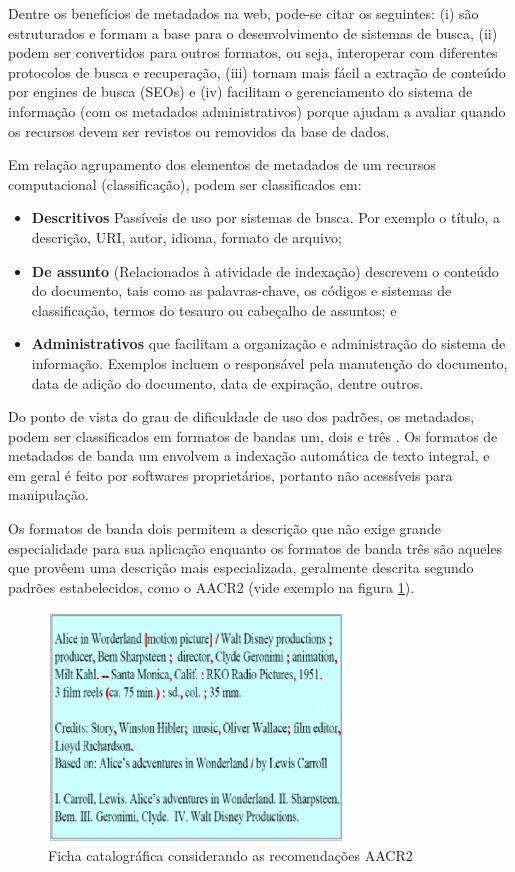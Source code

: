 Dentre os benefícios de metadados na web, pode-se citar os seguintes: (i) são estruturados e formam a base para o desenvolvimento de sistemas de busca, (ii) podem ser convertidos para outros formatos, ou seja, interoperar com diferentes protocolos de busca e recuperação, (iii) tornam mais fácil a extração de conteúdo por engines de busca (SEOs) e (iv) facilitam o gerenciamento do sistema de informação (com os metadados administrativos) porque ajudam a avaliar quando os recursos devem ser revistos ou removidos da base de dados.

Em relação agrupamento dos elementos de metadados de um recursos computacional (classificação), podem ser classificados em:

\begin{itemize}
	\item \textbf{Descritivos} Passíveis de uso por sistemas de busca. Por exemplo o título, a descrição, URI, autor, idioma, formato de arquivo;
	\item \textbf{De assunto} (Relacionados à atividade de indexação) descrevem o conteúdo do documento, tais como as palavras-chave, os códigos e sistemas de classificação, termos do tesauro ou cabeçalho de assuntos; e
	\item \textbf{Administrativos} que facilitam a organização e administração do sistema de informação. Exemplos incluem o responsável pela manutenção do documento, data de adição do documento, data de expiração, dentre outros.
\end{itemize}

Do ponto de vista do grau de dificuldade de uso dos padrões, os metadados, podem ser classificados em formatos de bandas um, dois e três \cite{feitosa2006organizacao}. Os formatos de metadados de banda um envolvem a indexação automática de texto integral, e em geral é feito por softwares proprietários, portanto não acessíveis para manipulação.

Os formatos de banda dois permitem a descrição que não exige grande especialidade para sua aplicação enquanto os formatos de banda três são aqueles que provêem uma descrição mais especializada, geralmente descrita segundo padrões estabelecidos, como o AACR2 (vide exemplo na figura \ref{fig:aacr2}). 

\graphicspath{{figuras/}}
\begin{figure}[H]
\centering
\includegraphics[width=0.7\textwidth]{aacr2}
\caption{Ficha catalográfica considerando as recomendações AACR2}
\label{fig:aacr2}
\end{figure}

